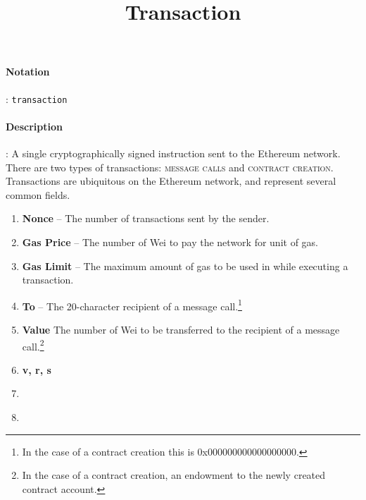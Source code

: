 \documentclass[10pt,a4paper,oneside]{scrartcl}
\author{}
\title{Transaction}
\date{}
\begin{document}
\maketitle
\paragraph{Notation}: \texttt{transaction}
\paragraph{Description}: A single cryptographically signed instruction sent to the Ethereum network. There are two types of transactions: \textsc{message calls} and \textsc{contract creation}. Transactions are ubiquitous on the Ethereum network, and represent several common fields. 

\begin{enumerate}

	\item \textbf{Nonce} -- The number of transactions sent by the sender.
	\item \textbf{Gas Price} -- The number of Wei to pay the network for unit of gas.
	\item \textbf{Gas Limit} -- The maximum amount of gas to be used in while executing a transaction. 

	\item \textbf{To} -- The 20-character recipient of a message call.\footnote{In the case of a contract creation this is 0x000000000000000000.}
	\item \textbf{Value} The number of Wei to be transferred to the recipient of a message call.\footnote{In the case of a contract creation, an endowment to the newly created contract account.}
	\item \textbf{v, r, s} 
	\item \textbf{}
	\item 
\end{enumerate}
\end{document}
